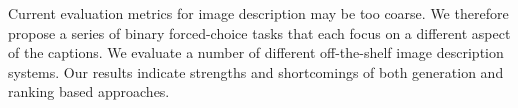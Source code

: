 Current evaluation metrics for image description may be too coarse. We therefore propose a series of binary forced-choice tasks that each focus on a different aspect of the captions. We evaluate a number of different off-the-shelf image description systems. Our results indicate  strengths and shortcomings of both generation and ranking based approaches.
